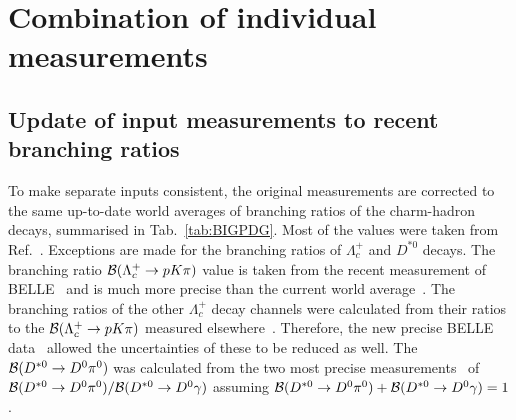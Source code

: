 \section{Combination of individual measurements}
\label{sec:comb}
\subsection{Update of input measurements to recent branching ratios}
\label{sec:pdgupdate}
To make separate inputs consistent, the original measurements are 
corrected to the same up-to-date world averages of branching ratios of 
the charm-hadron decays, summarised in Tab.~\ref{tab:BIGPDG}. Most of 
the values were taken from Ref.~\cite{PDG2014}. Exceptions are made
 for the  branching ratios of $\Lambda_c^{+}$ and $D^{*0}$ decays.
%
The branching ratio ${\cal B}(\Lambda_c^{+} \rightarrow p K\pi)$ value 
is taken from the recent measurement of BELLE~\cite{Zupanc:2013iki} and  
is much more precise than the current world average~\cite{PDG2014}. 
%
The branching ratios of the other $\Lambda_{c}^{+}$ decay channels were 
calculated from their ratios to  the ${\cal B}(\Lambda_c^{+}\rightarrow
p K\pi)$ measured elsewhere~\cite{Link:2005ut,Avery:1993vj,Alam:1998nb}. 
Therefore, the new precise BELLE data~\cite{Zupanc:2013iki} allowed 
the uncertainties of these to be reduced as well.
%
The ${\cal B}(D^{*0} \rightarrow D^{0}\pi^0)$ was calculated from the 
two most precise measurements~\cite{Ablikim:2014mww,Aubert:2005ik} of 
${\cal B}(D^{*0} \rightarrow D^{0}\pi^0)/{\cal B}(D^{*0} 
\rightarrow D^{0}\gamma)$ assuming ${\cal B}(D^{*0} \rightarrow 
D^{0}\pi^0)+{\cal B}(D^{*0} \rightarrow D^{0}\gamma)=1$.
\tabBIGPDG

